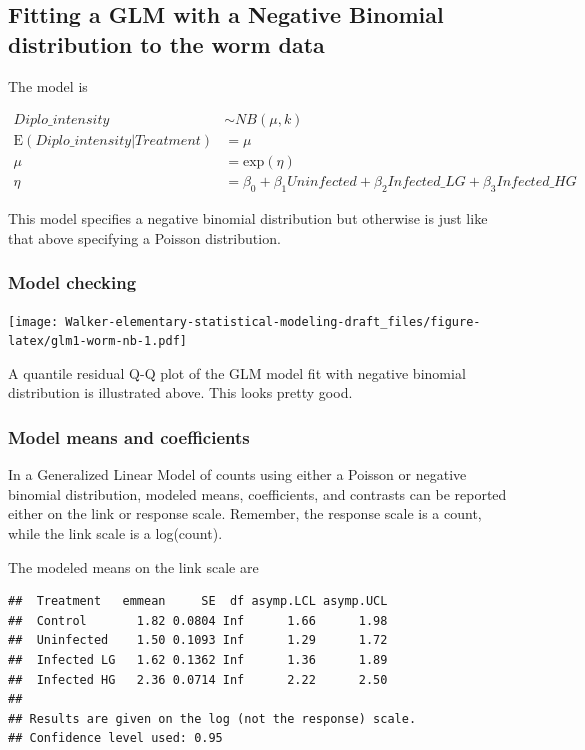\documentclass[]{book}
\begin{document}
\subsection{Fitting a GLM with a Negative Binomial distribution to the
worm
data}\label{fitting-a-glm-with-a-negative-binomial-distribution-to-the-worm-data}

The model is

\begin{align}
Diplo\_intensity &\sim NB(\mu, k)\\
\mathrm{E}({Diplo\_intensity|Treatment}) &= \mu\\
\mu &= \mathrm{exp}(\eta)\\
\eta &= \beta_0 + \beta_1 Uninfected + \beta_2 Infected\_LG + \beta_3 Infected\_HG
\end{align}

This model specifies a negative binomial distribution but otherwise is
just like that above specifying a Poisson distribution.

\subsubsection{Model checking}\label{model-checking-2}

\texttt{[image: Walker-elementary-statistical-modeling-draft\_files/figure-latex/glm1-worm-nb-1.pdf]}

A quantile residual Q-Q plot of the GLM model fit with negative binomial
distribution is illustrated above. This looks pretty good.

\subsubsection{Model means and
coefficients}\label{model-means-and-coefficients}

In a Generalized Linear Model of counts using either a Poisson or
negative binomial distribution, modeled means, coefficients, and
contrasts can be reported either on the link or response scale.
Remember, the response scale is a count, while the link scale is a
log(count).

The modeled means on the link scale are

\begin{verbatim}
##  Treatment   emmean     SE  df asymp.LCL asymp.UCL
##  Control       1.82 0.0804 Inf      1.66      1.98
##  Uninfected    1.50 0.1093 Inf      1.29      1.72
##  Infected LG   1.62 0.1362 Inf      1.36      1.89
##  Infected HG   2.36 0.0714 Inf      2.22      2.50
## 
## Results are given on the log (not the response) scale. 
## Confidence level used: 0.95
\end{verbatim}
\end{document}
